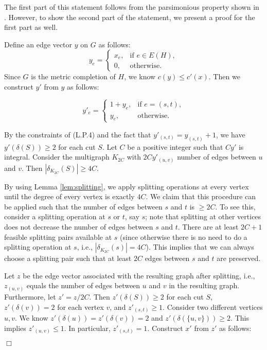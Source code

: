 \documentclass[11pt]{article}
\newcommand{\qed}{\hspace*{\fill}$\Box$}
\newenvironment{proof}[1][Proof. ]{\noindent {\bf #1 }}{\qed}
\begin{document}
\begin{proof}
The first part of this statement follows from the parsimonious property shown in \cite{BT97}. However, to show the second part of the statement, we present a proof for the first part as well.

Define an edge vector $y$ on $G$ as follows:
\begin{equation}
y_e = \begin{cases}
  x_e, & \text{if } e\in E(H), \\ \nonumber
  0, & \text{otherwise}.
\end{cases}
\end{equation}
Since $G$ is the metric completion of $H$, we know $c(y)\leq c'(x)$.
Then we construct $y'$ from $y$ as follows:

\begin{equation}
y'_e = \begin{cases}
  1+y_e, & \text{if } e=(s,t), \\ \nonumber
  y_e, & \text{otherwise}.
\end{cases}
\end{equation}

By the constraints of (L.P.4) and
the fact that $y'_{(s,t)}=y_{(s,t)}+1$,
we have $y'(\delta(S))\geq 2$ for each cut $S$.
Let $C$ be a positive integer such that $Cy'$ is integral.
Consider the multigraph $K_{2C}$ with $2Cy'_{(u, v)}$
number of edges between $u$ and $v$.
Then $|\delta_{K_{2C}}(S)|\geq 4C$.

By using Lemma \ref{lem:splitting}, we apply splitting operations at every
vertex until the degree of every vertex is exactly $4C$. We claim
that this procedure can be applied such that the number of edges
between $s$ and $t$ is $\geq 2C$. To see this, consider a splitting
operation at $s$ or $t$, say $s$; note that splitting at other vertices
does not decrease the number of edges between $s$ and $t$. There are at
least $2C+1$ feasible splitting pairs available at $s$ (since otherwise there is no
need to do a splitting operation at $s$, i.e., $|\delta_{K_{2C}}(s)|= 4C$). This implies
that we can always choose a splitting pair such that at least $2C$
edges between $s$ and $t$ are preserved.

Let $z$ be the edge vector associated with the resulting graph after
splitting, i.e., $z_{(u, v)}$ equals the number of edges between
$u$ and $v$ in the resulting graph. Furthermore, let $z'=z/2C$.
Then $z'(\delta(S))\geq 2$ for each cut $S$, $z'(\delta(v))=2$ for
each vertex $v$, and $z'_{(s, t)}\geq 1$. Consider two different
vertices $u, v$. We know $z'(\delta(u))=z'(\delta(v))=2$ and
$z'(\delta(\{u, v\}))\geq 2$. This implies $z'_{(u,v)}\leq 1$. In
particular, $z'_{(s, t)}=1$. Construct $x'$ from $z'$ as follows:


\end{proof}
\end{document}

